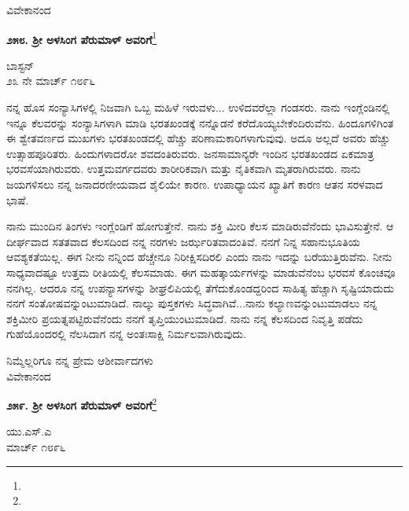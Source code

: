 \vspace{-0.35cm}

{\flushright
ವಿವೇಕಾನಂದ\par}

\begin{center}
\textbf{೨೫೮. ಶ‍್ರೀ ಅಳಸಿಂಗ ಪೆರುಮಾಳ್ ಅವರಿಗೆ}\footnote{}
\end{center}

\vspace{-0.7cm}

\begin{flushright}
ಬಾಸ್ಟನ್\\೨೩ ನೇ ಮಾರ್ಚ್ ೧೮೯೬
\end{flushright}

ನನ್ನ ಹೊಸ ಸಂನ್ಯಾಸಿಗಳಲ್ಲಿ ನಿಜವಾಗಿ ಒಬ್ಬ ಮಹಿಳೆ ಇರುವಳು... ಉಳಿದವರೆಲ್ಲಾ ಗಂಡಸರು. ನಾನು ಇಂಗ್ಲೆಂಡಿನಲ್ಲಿ ಇನ್ನೂ ಕೆಲವರನ್ನು ಸಂನ್ಯಾಸಿಗಳಾಗಿ ಮಾಡಿ ಭರತಖಂಡಕ್ಕೆ ನನ್ನೊಡನೆ ಕರೆದೊಯ್ಯಬೇಕೆಂದಿರುವೆನು. ಹಿಂದೂಗಳಿಗಿಂತ ಈ ಶ್ವೇತವರ್ಣದ ಮುಖಗಳು ಭರತಖಂಡದಲ್ಲಿ ಹೆಚ್ಚು ಪರಿಣಾಮಕಾರಿಗಳಾಗುವುವು. ಅದೂ ಅಲ್ಲದೆ ಅವರು ಹೆಚ್ಚು ಉತ್ಸಾಹಪೂರಿತರು. ಹಿಂದುಗಳಾದರೋ ಶವದಂತಿರುವರು. ಜನಸಾಮಾನ್ಯರೇ ಇಂದಿನ ಭರತಖಂಡದ ಏಕಮಾತ್ರ ಭರವಸೆಯಾಗಿರುವರು. ಉತ್ತಮವರ್ಗದವರು ಶಾರೀರಿಕವಾಗಿ ಮತ್ತು ನೈತಿಕವಾಗಿ ಮೃತರಾಗಿರುವರು. ನಾನು ಜಯಗಳಿಸಲು ನನ್ನ ಜನಾದರಣೀಯವಾದ ಶೈಲಿಯೇ ಕಾರಣ. ಉಪಾಧ್ಯಾಯನ ಖ್ಯಾತಿಗೆ ಕಾರಣ ಆತನ ಸರಳವಾದ ಭಾಷೆ.

ನಾನು ಮುಂದಿನ ತಿಂಗಳು ಇಂಗ್ಲೆಂಡಿಗೆ ಹೋಗುತ್ತೇನೆ. ನಾನು ಶಕ್ತಿ ಮೀರಿ ಕೆಲಸ ಮಾಡಿರುವೆನೆಂದು ಭಾವಿಸುತ್ತೇನೆ. ಆ ದೀರ್ಘವಾದ ಸತತವಾದ ಕೆಲಸದಿಂದ ನನ್ನ ನರಗಳು ಜರ್ಝರಿತವಾದಂತಿವೆ. ನನಗೆ ನಿನ್ನ ಸಹಾನುಭೂತಿಯ ಆವಶ್ಯಕತೆಯಿಲ್ಲ. ಈಗ ನೀನು ನನ್ನಿಂದ ಹೆಚ್ಚೇನೂ ನಿರೀಕ್ಷಿಸದಿರಲಿ ಎಂದು ನಾನು ಇದನ್ನು ಬರೆಯುತ್ತಿರುವೆನು. ನೀನು ಸಾಧ್ಯವಾದಷ್ಟೂ ಉತ್ತಮ ರೀತಿಯಲ್ಲಿ ಕೆಲಸಮಾಡು. ಈಗ ಮಹತ್ಕಾರ್ಯಗಳನ್ನು ಮಾಡುವೆನೆಂಬ ಭರವಸೆ ಕೊಂಚವೂ ನನಗಿಲ್ಲ. ಆದರೂ ನನ್ನ ಉಪನ್ಯಾಸಗಳನ್ನು ಶೀಘ್ರಲಿಪಿಯಲ್ಲಿ ತೆಗೆದುಕೊಂಡದ್ದರಿಂದ ಸಾಹಿತ್ಯ ಹೆಚ್ಚಾಗಿ ಸೃಷ್ಟಿಯಾದುದು ನನಗೆ ಸಂತೋಷವನ್ನುಂಟುಮಾಡಿದೆ. ನಾಲ್ಕು ಪುಸ್ತಕಗಳು ಸಿದ್ಧವಾಗಿವೆ...ನಾನು ಕಲ್ಯಾಣವನ್ನುಂಟುಮಾಡಲು ನನ್ನ ಶಕ್ತಿಮೀರಿ ಪ್ರಯತ್ನಪಟ್ಟಿರುವೆನೆಂದು ನನಗೆ ತೃಪ್ತಿಯುಂಟುಮಾಡಿದೆ. ನಾನು ನನ್ನ ಕೆಲಸದಿಂದ ನಿವೃತ್ತಿ ಪಡೆದು ಗುಹೆಯೊಂದರಲ್ಲಿ ನೆಲಸಿದಾಗ ನನ್ನ ಅಂತಃಸಾಕ್ಷಿ ನಿರ್ಮಲವಾಗಿರುವುದು.

{\flushright
ನಿಮ್ಮೆಲ್ಲರಿಗೂ ನನ್ನ ಪ್ರೇಮ ಆಶೀರ್ವಾದಗಳು\\ವಿವೇಕಾನಂದ\par}

\begin{center}
\textbf{೨೫೯. ಶ‍್ರೀ ಅಳಸಿಂಗ ಪೆರುಮಾಳ್ ಅವರಿಗೆ}\footnote{}
\end{center}

\begin{flushright}
ಯು.ಎಸ್.ಎ\\ಮಾರ್ಚ್ ೧೮೯೬
\end{flushright}

